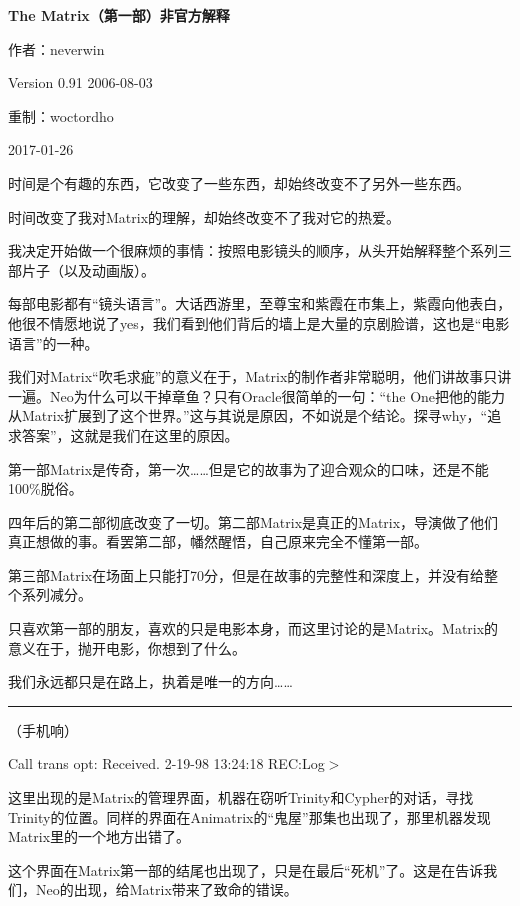\documentclass[UTF8]{ctexart}
\newcommand{\myparsep}{\noindent \rule[0.5ex]{\linewidth}{1pt}}
\newenvironment{myquote}{\color{green} \setlength{\leftskip}{6em} \setlength{\rightskip}{4em} \setlength{\parindent}{-2em}}{\par}
\begin{document}
\centerline{\bf \fontsize{15.75pt} \baselineskip \selectfont The Matrix（第一部）非官方解释}
\vspace{12pt}
\centerline{作者：neverwin}
\centerline{Version 0.91 2006-08-03}
\centerline{重制：woctordho}
\centerline{2017-01-26}
\vspace{12pt}

时间是个有趣的东西，它改变了一些东西，却始终改变不了另外一些东西。

时间改变了我对Matrix的理解，却始终改变不了我对它的热爱。

我决定开始做一个很麻烦的事情：按照电影镜头的顺序，从头开始解释整个系列三部片子（以及动画版）。

每部电影都有“镜头语言”。大话西游里，至尊宝和紫霞在市集上，紫霞向他表白，他很不情愿地说了yes，我们看到他们背后的墙上是大量的京剧脸谱，这也是“电影语言”的一种。

我们对Matrix“吹毛求疵”的意义在于，Matrix的制作者非常聪明，他们讲故事只讲一遍。Neo为什么可以干掉章鱼？只有Oracle很简单的一句：“the One把他的能力从Matrix扩展到了这个世界。”这与其说是原因，不如说是个结论。探寻why，“追求答案”，这就是我们在这里的原因。

第一部Matrix是传奇，第一次……但是它的故事为了迎合观众的口味，还是不能100\%脱俗。

四年后的第二部彻底改变了一切。第二部Matrix是真正的Matrix，导演做了他们真正想做的事。看罢第二部，幡然醒悟，自己原来完全不懂第一部。

第三部Matrix在场面上只能打70分，但是在故事的完整性和深度上，并没有给整个系列减分。

只喜欢第一部的朋友，喜欢的只是电影本身，而这里讨论的是Matrix。Matrix的意义在于，抛开电影，你想到了什么。

我们永远都只是在路上，执着是唯一的方向……

\myparsep

\begin{myquote}
（手机响）

Call trans opt: Received. 2-19-98 13:24:18 REC:Log$>$
\end{myquote}

这里出现的是Matrix的管理界面，机器在窃听Trinity和Cypher的对话，寻找Trinity的位置。同样的界面在Animatrix的“鬼屋”那集也出现了，那里机器发现Matrix里的一个地方出错了。

这个界面在Matrix第一部的结尾也出现了，只是在最后“死机”了。这是在告诉我们，Neo的出现，给Matrix带来了致命的错误。
\end{document}
